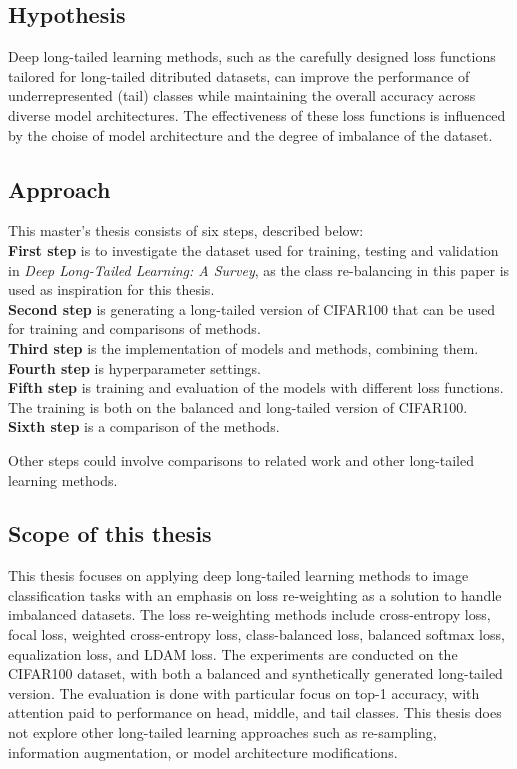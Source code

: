 \subsection{Hypothesis}
Deep long-tailed learning methods, such as the carefully designed loss functions tailored for long-tailed ditributed datasets, can improve the performance of underrepresented (tail) classes while maintaining the overall accuracy across diverse model architectures. The effectiveness of these loss functions is influenced by the choise of model architecture and the degree of imbalance of the dataset.


\subsection{Approach}
This master's thesis consists of six steps, described below:\\  

\textbf{First step} is to investigate the dataset used for training, testing and validation in \textit{Deep Long-Tailed Learning: A Survey}, as the class re-balancing in this paper is used as inspiration for this thesis.\\

\textbf{Second step} is generating a long-tailed version of CIFAR100 that can be used for training and comparisons of methods.\\

\textbf{Third step} is the implementation of models and methods, combining them.\\

\textbf{Fourth step} is hyperparameter settings.\\

\textbf{Fifth step} is training and evaluation of the models with different loss functions. The training is both on the balanced and long-tailed version of CIFAR100.\\

\textbf{Sixth step} is a comparison of the methods.

Other steps could involve comparisons to related work and other long-tailed learning methods.

\subsection{Scope of this thesis}
This thesis focuses on applying deep long-tailed learning methods to image classification tasks with an emphasis on loss re-weighting as a solution to handle imbalanced datasets. The loss re-weighting methods include cross-entropy loss, focal loss, weighted cross-entropy loss,  class-balanced loss, balanced softmax loss, equalization loss, and LDAM loss. The experiments are conducted on the CIFAR100 dataset, with both a balanced and synthetically generated long-tailed version. The evaluation is done with particular focus on top-1 accuracy, with attention paid to performance on head, middle, and tail classes. This thesis does not explore other long-tailed learning approaches such as re-sampling, information augmentation, or model architecture modifications. 

